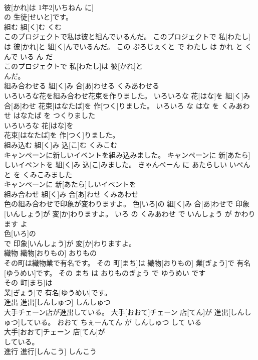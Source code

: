 \documentclass[8pt]{extreport}
\begin{document}
\begin{CJK}{UTF8}{min}
\\	彼[かれ]は 1年2[いちねん に]
\\	の 生徒[せいと]です。			
\\	組む	組[く]む	くむ	
\\	このプロジェクトで私は彼と組んでいるんだ。	このプロジェクトで 私[わたし]は 彼[かれ]と 組[く]んでいるんだ。	この ぷろじぇくと で わたし は かれ と くんで いる ん だ	
\\	このプロジェクトで 私[わたし]は 彼[かれ]と
\\	んだ。			
\\	組み合わせる	組[く]み 合[あ]わせる	くみあわせる	
\\	いろいろな花を組み合わせ花束を作りました。	いろいろな 花[はな]を 組[く]み 合[あ]わせ 花束[はなたば]を 作[つく]りました。	いろいろ な はな を くみあわせ はなたば を つくりました	
\\	いろいろな 花[はな]を
\\	花束[はなたば]を 作[つく]りました。			
\\	組み込む	組[く]み 込[こ]む	くみこむ	
\\	キャンペーンに新しいイベントを組み込みました。	キャンペーンに 新[あたら]しいイベントを 組[く]み 込[こ]みました。	きゃんぺーん に あたらしい いべんと を くみこみました	
\\	キャンペーンに 新[あたら]しいイベントを
\\	組み合わせ	組[く]み 合[あ]わせ	くみあわせ	
\\	色の組み合わせで印象が変わりますよ。	色[いろ]の 組[く]み 合[あ]わせで 印象[いんしょう]が 変[か]わりますよ。	いろ の くみあわせ で いんしょう が かわります よ	
\\	色[いろ]の
\\	で 印象[いんしょう]が 変[か]わりますよ。			
\\	織物	織物[おりもの]	おりもの	
\\	その町は織物業で有名です。	その 町[まち]は 織物[おりもの] 業[ぎょう]で 有名[ゆうめい]です。	その まち は おりものぎょう で ゆうめい です	
\\	その 町[まち]は
\\	業[ぎょう]で 有名[ゆうめい]です。			
\\	進出	進出[しんしゅつ]	しんしゅつ	
\\	大手チェーン店が進出している。	大手[おおて]チェーン 店[てん]が 進出[しんしゅつ]している。	おおて ちぇーんてん が しんしゅつ して いる	
\\	大手[おおて]チェーン 店[てん]が
\\	している。			
\\	進行	進行[しんこう]	しんこう	

\end{CJK}
\end{document}
